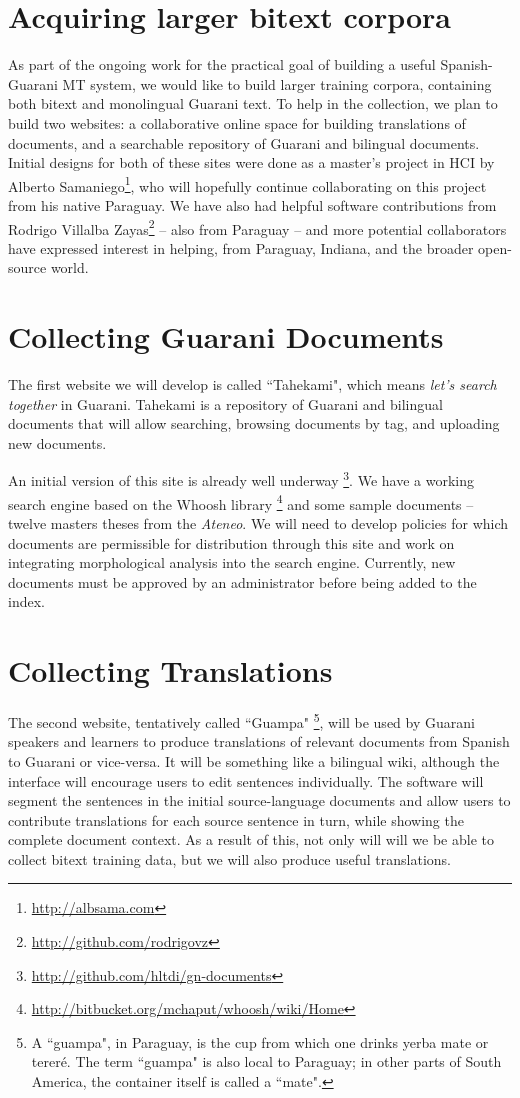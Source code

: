 \section{Acquiring larger bitext corpora}
\label{sec:crowdsourcing}
As part of the ongoing work for the practical goal of building a useful
Spanish-Guarani MT system, we would like to build larger training corpora,
containing both bitext and monolingual Guarani text.
To help in the collection, we plan to build two websites:
a collaborative online space for building translations of documents, 
and a searchable repository of Guarani and bilingual documents.
Initial designs for both of these sites were done as a master's project in HCI
by Alberto Samaniego\footnote{\url{http://albsama.com}}, who will hopefully
continue collaborating on this project from his native Paraguay.
We have also had helpful software contributions from
Rodrigo Villalba Zayas\footnote{\url{http://github.com/rodrigovz}} --
also from Paraguay -- and more potential collaborators have expressed
interest in helping, from Paraguay, Indiana, and the broader open-source world.

\section{Collecting Guarani Documents}
The first website we will develop is called ``Tahekami", which means
\emph{let's search together} in Guarani.
Tahekami is a repository of Guarani and bilingual documents that will allow
searching, browsing documents by tag, and uploading new documents.

An initial version of this site is already well underway
\footnote{\url{http://github.com/hltdi/gn-documents}}.  We have a working
search engine based on the Whoosh library
\footnote{\url{http://bitbucket.org/mchaput/whoosh/wiki/Home}} and some sample
documents -- twelve masters theses from the \emph{Ateneo}. We will need to
develop policies for which documents are permissible for distribution through
this site and work on integrating morphological analysis into the search
engine. Currently, new documents must be approved by an administrator before
being added to the index.

\section{Collecting Translations}
The second website, tentatively called ``Guampa"
\footnote{A ``guampa", in Paraguay, is the cup from which one drinks yerba mate
or tereré. The term ``guampa" is also local to Paraguay; in other parts of
South America, the container itself is called a ``mate".},
will be used by Guarani speakers and learners to produce translations of
relevant documents from Spanish to Guarani or vice-versa.
It will be something like a bilingual wiki, although the interface will
encourage users to edit sentences individually.
The software will segment the sentences in the initial
source-language documents and allow users to contribute translations for each
source sentence in turn, while showing the complete document context.
As a result of this, not only will will we be able to collect bitext training
data, but we will also produce useful translations.

